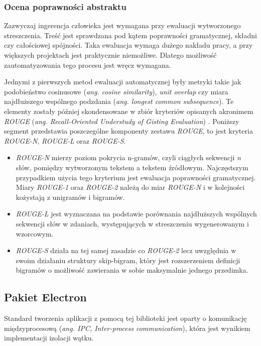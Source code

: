 \documentclass[12pt,a4paper,twoside]{article}
\begin{document}
\subsubsection{Ocena poprawności abstraktu}
Zazwyczaj ingerencja człowieka jest wymagana przy ewaluacji wytworzonego streszczenia. Treść jest sprawdzana pod kątem poprawności gramatycznej, składni czy całościowej spójności. Taka ewaluacja wymaga dużego nakładu pracy, a przy większych projektach jest praktycznie niemożliwe. Dlatego możliwość zautomatyzowania tego procesu jest wręcz wymagana.\par
Jednymi z pierwszych metod ewaluacji automatycznej były metryki takie jak podobieństwo cosinusowe (\textit{ang. cosine similarity}), \textit{unit overlap} czy miara najdłuższego wspólnego podzdania (\textit{ang. longest common subsequence}). Te elementy zostały później skondensowane w zbiór kryteriów opisanych akronimem \textit{ROUGE} (\textit{ang. Recall-Oriented Understudy of Gisting Evaluation}) \cite{rouge}. Poniższy segment przedstawia poszczególne komponenty zestawu \textit{ROUGE}, to jest kryteria \textit{ROUGE-N}, \textit{ROUGE-L} oraz \textit{ROUGE-S}.\par
\begin{itemize}
	\item \textit{ROUGE-N} mierzy poziom pokrycia n-gramów, czyli ciągłych sekwencji \textit{n} słów, pomiędzy wytworzonym tekstem a tekstem źródłowym. Najczęstszym przypadkiem użycia tego kryterium jest ewaluacja poprawności gramatycznej. Miary \textit{ROUGE-1} oraz \textit{ROUGE-2} należą do miar \textit{ROUGE-N} i w kolejności kożystają z unigramów i bigramów.
	\item \textit{ROUGE-L} jest wyznaczana na podstawie porównania najdłuższych wspólnych sekwencji słów w zdaniach, występujących w streszczeniu wygenerowanym i wzorcowym. 
	\item \textit{ROUGE-S} działa na tej samej zasadzie co \textit{ROUGE-2} lecz uwzględnia w swoim działaniu struktury skip-bigram, który jest rozszerzeniem definicji bigramów o możliwość zawierania w sobie maksymalnie jednego przedimka.
\end{itemize}
\subsection{Pakiet Electron}
Standard tworzenia aplikacji z pomocą tej biblioteki jest oparty o komunikację międzyprocesową (\textit{ang. IPC, Inter-process communication}), która jest wynikiem implementacji izolacji wątku. 
\end{document}
